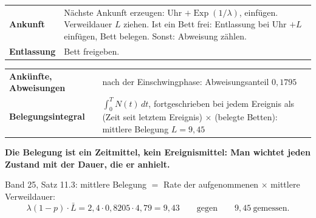 \begin{merksatz}
\begin{center}
{\small
\renewcommand{\arraystretch}{1.5}
\begin{tabular}{@{}P{2.2cm}P{6.6cm}@{}}
\toprule
\textbf{Ankunft} & Nächste Ankunft erzeugen: Uhr $+\operatorname{Exp}(1/\lambda)$, einfügen. Verweildauer $L$ ziehen. Ist ein Bett frei: Entlassung bei Uhr $+L$ einfügen, Bett belegen. Sonst: Abweisung zählen.\\
\textbf{Entlassung} & Bett freigeben.\\
\bottomrule
\end{tabular}}
\end{center}

\begin{center}
{\small
\renewcommand{\arraystretch}{1.5}
\begin{tabular}{@{}P{3.0cm}P{5.6cm}@{}}
\toprule
\textbf{Ankünfte, Abweisungen} & nach der Einschwingphase: Abweisungsanteil $0{,}1795$\\
\textbf{Belegungsintegral} & $\int_0^T N(t)\,dt$, fortgeschrieben bei jedem Ereignis als (Zeit seit letztem Ereignis) $\times$ (belegte Betten): mittlere Belegung $L = 9{,}45$\\
\bottomrule
\end{tabular}}
\end{center}

\begin{center}
\begin{minipage}{0.9\textwidth}
\textbf{Die Belegung ist ein Zeitmittel, kein Ereignismittel: Man wichtet jeden Zustand mit der Dauer, die er anhielt.}
\end{minipage}
\end{center}

Band 25, Satz 11.3: mittlere Belegung $=$ Rate der aufgenommenen $\times$ mittlere Verweildauer:
\[ \lambda(1-p)\cdot\bar L = 2{,}4\cdot0{,}8205\cdot4{,}79 = 9{,}43 \qquad\text{gegen}\qquad 9{,}45 \ \text{gemessen.} \]

\begin{center}
\begin{minipage}{0.88\textwidth}
\end{minipage}
\end{center}
\end{merksatz}

